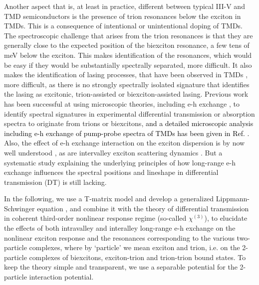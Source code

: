 \documentclass[aps,prb,superscriptaddress,letterpaper,amsmath,amssymb,twocolumn,preprintnumbers]{revtex4}
\newcommand\revisionA[1]{\textcolor{black}{#1}}
\begin{document}
 Another aspect that is, at least in practice, different between typical III-V and TMD semiconductors is the presence of trion resonances below the exciton in TMDs. This is a consequence of intentional or unintentional doping of TMDs. The spectroscopic challenge that arises from the trion resonances is that they are generally close to the expected position of the  biexciton resonance, a few tens of meV below the exciton. This makes identification of the resonances, which would be easy if they would be substantially spectrally separated, more difficult.  It also makes the identification of lasing processes, that have been observed in TMDs
 \cite{ye-etal.15,wu-etal.15Nature,li-CZNing-etal.17}, more difficult, as there is no strongly spectrally isolated  signature that identifies the lasing as excitonic, trion-assisted or biexciton-assisted lasing.
Previous work
\cite{hao-etal.16nanolett,hao-etal.17,steinhoff-etal.2018}
has been successful at using microscopic theories, including e-h exchange \cite{steinhoff-etal.2018},
 to identify spectral signatures in experimental differential transmission or absorption spectra to originate from trions or biexcitons,
 \revisionA{
 and a detailed microscopic analysis including e-h exchange of pump-probe spectra of TMDs has been given in Ref. \onlinecite{katsch-etal.2019-2DMaterials}.
 }
 Also, the effect of e-h exchange interaction on the exciton dispersion is by now well understood
 \cite{yu-etal.14,wu-etal.15prb,qiu-etal.15,steinhoff-etal.2018,deilmann-thygesen.19,schneider-etal.2019,hong-etal.2020}, as are intervalley exciton scattering dynamics \cite{jiang-etal.2021}.
But a systematic study explaining the underlying principles of how long-range e-h exchange influences the spectral positions and lineshape in differential transmission (DT) is still lacking.



In the following, we use a T-matrix model  and develop a generalized Lippmann-Schwinger equation \cite{engelbrecht-randeria.92,takayama-etal.02},
and combine it
with the theory of differential transmission in coherent third-order nonlinear response regime
\cite{takayama-etal.04}
 (so-called $\chi^{(3)}$), to elucidate the effects of both intravalley and interalley long-range e-h exchange on the nonlinear exciton response and the resonances corresponding to the
various two-particle complexes, where by `particle' we mean exciton and trion, i.e. on  the 2-particle complexes of biexcitons,
 exciton-trion and trion-trion bound states. To keep the theory simple and transparent, we use a separable potential for the 2-particle interaction potential.
\end{document}
